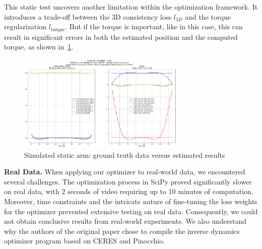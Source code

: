 This static test uncovers another limitation within the optimization framework. It introduces a 
trade-off between the 3D consistency loss \(l_{3D}\) and the torque regularization 
\(l_{\text{torque}}\). But if the torque is important, like in this case, this can result in 
significant errors in both the estimated 
position and the computed torque, as shown in~\cref{fig:static}.

\begin{figure}[H]
    \centering
    \includegraphics[width=8cm]{figures/inverse_dynamics_static_case.png}
    \caption{Simulated static arm: ground truth data versus estimated results}
    \label{fig:static}
\end{figure}



\noindent\textbf{Real Data.} When applying our optimizer to real-world data, we encountered several challenges. 
The optimization process in SciPy proved significantly slower on real data, with 2 seconds of video requiring up to 10 minutes of 
computation. Moreover, time constraints and the intricate nature of fine-tuning the loss weights for the optimizer prevented extensive 
testing on real data. Consequently, we could not obtain conclusive results from real-world experiments. We also understand
why the authors of the original paper chose to compile the inverse dynamics optimizer program based on CERES and Pinocchio.